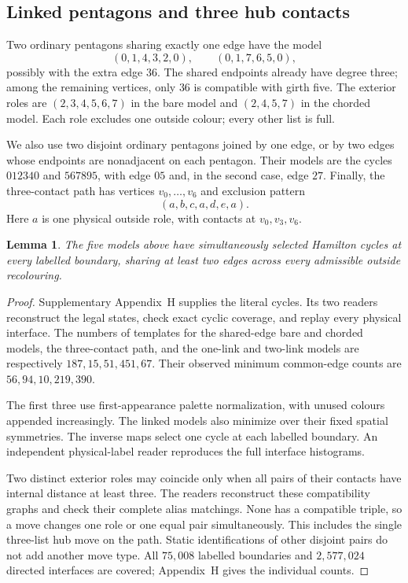 \documentclass[11pt]{article}
\newtheorem{lemma}[theorem]{Lemma}
\theoremstyle{remark}
\numberwithin{equation}{section}
\numberwithin{table}{section}
\begin{document}
\subsection{Linked pentagons and three hub contacts}

Two ordinary pentagons sharing exactly one edge have the model
\[
 (0,1,4,3,2,0),\qquad (0,1,7,6,5,0),
\]
possibly with the extra edge $36$. The shared endpoints already have
degree three; among the remaining vertices, only $36$ is compatible
with girth five. The exterior roles are $(2,3,4,5,6,7)$ in the bare
model and $(2,4,5,7)$ in the chorded model. Each role excludes one
outside colour; every other list is full.

We also use two disjoint ordinary pentagons joined by one edge, or by
two edges whose endpoints are nonadjacent on each pentagon. Their
models are the cycles $012340$ and $567895$, with edge $05$ and,
in the second case, edge $27$. Finally, the three-contact path has
vertices $v_0,\ldots,v_6$ and exclusion pattern
\[
 (a,b,c,a,d,e,a).
\]
Here $a$ is one physical outside role, with contacts at $v_0,v_3,v_6$.

\begin{lemma}\label{lem:extended-cycle-data}
The five models above have simultaneously selected Hamilton cycles
at every labelled boundary, sharing at least two edges across every
admissible outside recolouring.
\end{lemma}
\begin{proof}
Supplementary Appendix~H supplies the literal cycles. Its two readers
reconstruct the legal states, check exact cyclic coverage, and replay
every physical interface. The numbers of templates for the shared-edge
bare and chorded models, the three-contact path, and the one-link and
two-link models are respectively $187,15,51,451,67$. Their observed
minimum common-edge counts are $56,94,10,219,390$.

The first three use first-appearance palette normalization, with unused
colours appended increasingly. The linked models also minimize over
their fixed spatial symmetries. The inverse maps select one cycle at
each labelled boundary. An independent physical-label reader reproduces
the full interface histograms.

Two distinct exterior roles may coincide only when all pairs of their
contacts have internal distance at least three. The readers reconstruct
these compatibility graphs and check their complete alias matchings.
None has a compatible triple, so a move changes one role or one equal
pair simultaneously. This includes the single three-list hub move on
the path. Static identifications of other disjoint pairs do not add
another move type. All $75{,}008$ labelled boundaries and $2{,}577{,}024$
directed interfaces are covered; Appendix~H gives the individual counts.
\end{proof}
\end{document}
